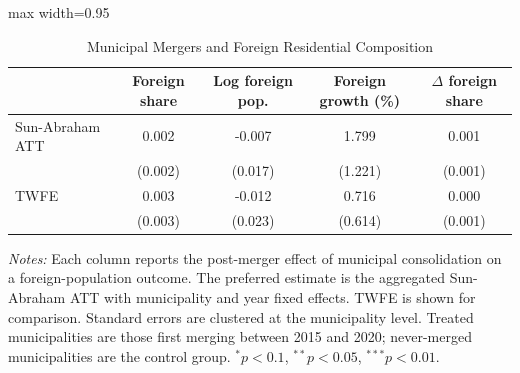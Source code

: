 \begin{table}[htbp]\centering
\caption{Municipal Mergers and Foreign Residential Composition}
\begin{adjustbox}{max width=0.95\textwidth}
\begin{tabular}{lcccc}
\toprule
 & Foreign share & Log foreign pop. & Foreign growth (\%) & $\Delta$ foreign share \\
\midrule
Sun-Abraham ATT & 0.002 & -0.007 & 1.799 & 0.001 \\
  & (0.002) & (0.017) & (1.221) & (0.001) \\
TWFE & 0.003 & -0.012 & 0.716 & 0.000 \\
  & (0.003) & (0.023) & (0.614) & (0.001) \\
\bottomrule
\end{tabular}
\end{adjustbox}
\parbox{0.95\textwidth}{\footnotesize \textit{Notes:} Each column reports the post-merger effect of municipal consolidation on a foreign-population outcome. The preferred estimate is the aggregated Sun-Abraham ATT with municipality and year fixed effects. TWFE is shown for comparison. Standard errors are clustered at the municipality level. Treated municipalities are those first merging between 2015 and 2020; never-merged municipalities are the control group. $^{*}p<0.1$, $^{**}p<0.05$, $^{***}p<0.01$.}
\end{table}

